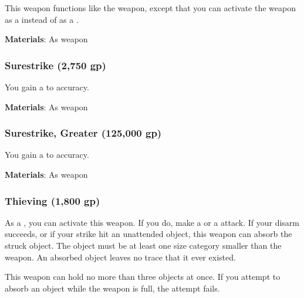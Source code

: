 This weapon functions like the  weapon, except that you can activate the weapon as a  instead of as a .



\vspace{0.25em}
\textbf{Materials}: As weapon


\lowercase{\hypertarget{item:Surestrike}{}}\label{item:Surestrike}
\hypertarget{item:Surestrike}{\subsubsection{Surestrike\hfill{} (2,750 gp)}}

You gain a   to accuracy.



\vspace{0.25em}
\textbf{Materials}: As weapon


\lowercase{\hypertarget{item:Surestrike, Greater}{}}\label{item:Surestrike, Greater}
\hypertarget{item:Surestrike, Greater}{\subsubsection{Surestrike, Greater\hfill{} (125,000 gp)}}

You gain a   to accuracy.



\vspace{0.25em}
\textbf{Materials}: As weapon


\lowercase{\hypertarget{item:Thieving}{}}\label{item:Thieving}
\hypertarget{item:Thieving}{\subsubsection{Thieving\hfill{} (1,800 gp)}}

As a , you can activate this weapon.
If you do, make a  or a  attack.
If your disarm succeeds, or if your strike hit an unattended object, this weapon can absorb the struck object.
The object must be at least one size category smaller than the weapon.
An absorbed object leaves no trace that it ever existed.

This weapon can hold no more than three objects at once.
If you attempt to absorb an object while the weapon is full, the attempt fails.


